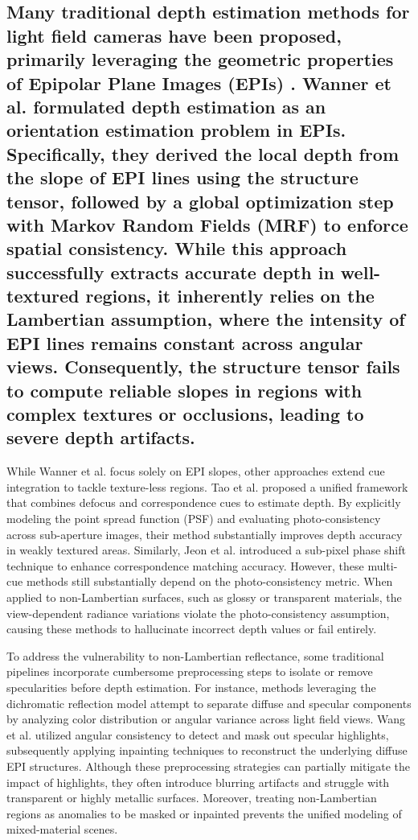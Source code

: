 \documentclass[lettersize,journal]{IEEEtran}
\begin{document}
\subsection{Many traditional depth estimation methods for light field cameras have been proposed, primarily leveraging the geometric properties of Epipolar Plane Images (EPIs) \cite{epipolarepipo}. Wanner et al. \cite{wannerwanne} formulated depth estimation as an orientation estimation problem in EPIs. Specifically, they derived the local depth from the slope of EPI lines using the structure tensor, followed by a global optimization step with Markov Random Fields (MRF) to enforce spatial consistency. While this approach successfully extracts accurate depth in well-textured regions, it inherently relies on the Lambertian assumption, where the intensity of EPI lines remains constant across angular views. Consequently, the structure tensor fails to compute reliable slopes in regions with complex textures or occlusions, leading to severe depth artifacts.}

While Wanner et al. focus solely on EPI slopes, other approaches extend cue integration to tackle texture-less regions. Tao et al. \cite{taotao} proposed a unified framework that combines defocus and correspondence cues to estimate depth. By explicitly modeling the point spread function (PSF) and evaluating photo-consistency across sub-aperture images, their method substantially improves depth accuracy in weakly textured areas. Similarly, Jeon et al. \cite{jeonjeon} introduced a sub-pixel phase shift technique to enhance correspondence matching accuracy. However, these multi-cue methods still substantially depend on the photo-consistency metric. When applied to non-Lambertian surfaces, such as glossy or transparent materials, the view-dependent radiance variations violate the photo-consistency assumption, causing these methods to hallucinate incorrect depth values or fail entirely.

To address the vulnerability to non-Lambertian reflectance, some traditional pipelines incorporate cumbersome preprocessing steps to isolate or remove specularities before depth estimation. For instance, methods leveraging the dichromatic reflection model \cite{dichromati} attempt to separate diffuse and specular components by analyzing color distribution or angular variance across light field views. Wang et al. \cite{wangwang} utilized angular consistency to detect and mask out specular highlights, subsequently applying inpainting techniques to reconstruct the underlying diffuse EPI structures. Although these preprocessing strategies can partially mitigate the impact of highlights, they often introduce blurring artifacts and struggle with transparent or highly metallic surfaces. Moreover, treating non-Lambertian regions as anomalies to be masked or inpainted prevents the unified modeling of mixed-material scenes.
\end{document}
